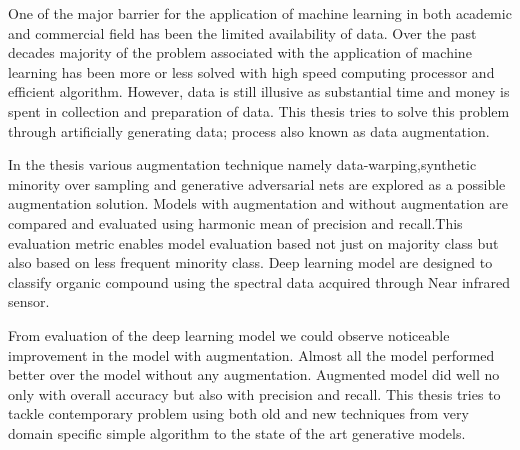 

One of the major barrier for the application of machine learning in both academic and commercial field has been the limited availability of data. Over the past
decades majority of the problem associated with the application of machine
learning has been more or less solved with high speed computing processor and
efficient algorithm. However, data is still illusive as substantial time and money
is spent in collection and preparation of data. This thesis tries to solve
this problem through artificially generating data; process also known as data
augmentation.

In the thesis various augmentation technique namely data-warping,synthetic minority over sampling and generative adversarial nets are explored as a possible
augmentation solution. Models with augmentation and without augmentation are compared and evaluated using harmonic mean of precision and recall.This evaluation metric enables model evaluation based not just on majority class but also based on less frequent minority class. Deep learning model are designed to classify organic compound using the spectral data acquired through Near infrared sensor.

From evaluation of the deep learning model we could observe noticeable improvement in the model with augmentation. Almost all the model performed better over the model without any augmentation. Augmented model did well no only with overall accuracy but also with precision and recall. This thesis tries to tackle contemporary problem using both old and new techniques from very domain specific simple algorithm to the state of the art generative models.